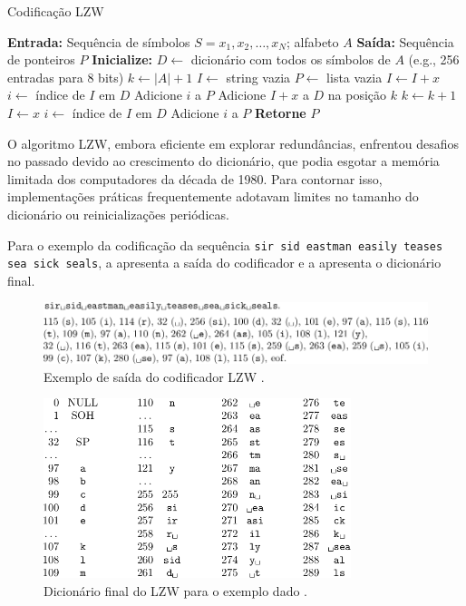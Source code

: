 \begin{algorithm}
\caption{Codificação LZW}
\label{alg:lzw}
\begin{algorithmic}[1]
\State \textbf{Entrada:} Sequência de símbolos \( S = x_1, x_2, \dots, x_N \); alfabeto \( A \)
\State \textbf{Saída:} Sequência de ponteiros \( P \)
\State \textbf{Inicialize:}
\State \quad \( D \gets \) dicionário com todos os símbolos de \( A \) (e.g., 256 entradas para 8 bits)
\State \quad \( k \gets |A| + 1 \) 
\State \quad \( I \gets \) string vazia 
\State \quad \( P \gets \) lista vazia 
        \State \( I \gets I + x \)
    \Else
        \State \( i \gets \) índice de \( I \) em \( D \)
        \State Adicione \( i \) a \( P \)
        \State Adicione \( I + x \) a \( D \) na posição \( k \)
        \State \( k \gets k + 1 \)
        \State \( I \gets x \)
    \EndIf
\EndFor
{}
    \State \( i \gets \) índice de \( I \) em \( D \)
    \State Adicione \( i \) a \( P \)
\EndIf
\State \textbf{Retorne} \( P \)
\end{algorithmic}
\end{algorithm}


O algoritmo LZW, embora eficiente em explorar redundâncias, enfrentou desafios
no passado devido ao crescimento do dicionário, que podia esgotar a memória
limitada dos computadores da década de 1980. Para contornar isso,
implementações práticas frequentemente adotavam limites no tamanho do
dicionário ou reinicializações periódicas.

Para o exemplo da codificação da sequência \texttt{sir sid eastman easily teases sea sick seals},
a  apresenta a saída do codificador e
a  apresenta o dicionário final.


  \begin{figure}[h]
  \centering
  \includegraphics[width=\textwidth]{figures/lzw_example.png}
  \caption{Exemplo de saída do codificador LZW \parencite{salomon2007}.}
  \label{fig:lzw_example}
  \end{figure}

  \begin{figure}[h]
  \centering
  \includegraphics[width=0.8\textwidth]{figures/lzw_dictionary.png}
  \caption{Dicionário final do LZW para o exemplo dado \parencite{salomon2007}.}
  \label{fig:lzw_dictionary}
  \end{figure}
